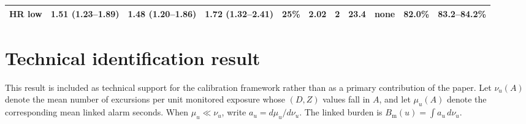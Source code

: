\documentclass[11pt,letterpaper]{article}
\begin{document}
\begin{table}[htbp]
\begin{tabular}{@{}lllllrrrrrr@{}}
HR low & 1.51 (1.23--1.89) & 1.48 (1.20--1.86) & 1.72 (1.32--2.41) & 25\% & 2.02 & 2 & 23.4 & none & 82.0\% & 83.2--84.2\% \\
\bottomrule
\end{tabular}
\end{table}







\section{Technical identification result}\label{s:technical}
This result is included as technical support for the calibration framework rather than as a primary contribution of the paper. Let $\nu_u(A)$ denote the mean number of excursions per unit monitored exposure whose $(D,Z)$ values fall in $A$, and let $\mu_u(A)$ denote the corresponding mean linked alarm seconds. When $\mu_u\ll\nu_u$, write $a_u=d\mu_u/d\nu_u$. The linked burden is $B_{\mathrm m}(u)=\int a_u\,d\nu_u$.
\end{document}
